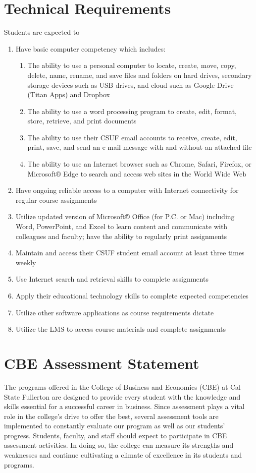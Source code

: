 \documentclass{syllabus}
\begin{document}
\section*{Technical Requirements}
Students are expected to
\begin{enumerate}
\item Have basic computer competency which includes:
\begin{enumerate}
\item	The ability to use a personal computer to locate, create, move, copy, delete, name, rename, and save files and folders on hard drives, secondary storage devices such as USB drives, and cloud such as Google Drive (Titan Apps) and Dropbox
\item	The ability to use a word processing program to create, edit, format, store, retrieve, and print documents
\item	The ability to use their CSUF email accounts to receive, create, edit, print, save, and send an e-mail message with and without an attached file
\item	The ability to use an Internet browser such as Chrome, Safari, Firefox, or Microsoft® Edge to search and access web sites in the World Wide Web
\end{enumerate}
\item	Have ongoing reliable access to a computer with Internet connectivity for regular course assignments
\item	Utilize updated version of Microsoft® Office (for P.C. or Mac) including Word, PowerPoint, and Excel to learn content and communicate with colleagues and faculty; have the ability to regularly print assignments
\item	Maintain and access their CSUF student email account at least three times weekly
\item	Use Internet search and retrieval skills to complete assignments
\item	Apply their educational technology skills to complete expected competencies
\item	Utilize other software applications as course requirements dictate
\item	Utilize the LMS to access course materials and complete assignments
\end{enumerate}



\section*{CBE Assessment Statement}
The programs offered in the College of Business and Economics (CBE) at Cal State Fullerton are designed to provide every student with the knowledge and skills essential for a successful career in business. Since assessment plays a vital role in the college's drive to offer the best, several assessment tools are implemented to constantly evaluate our program as well as our students' progress. Students, faculty, and staff should expect to participate in CBE assessment activities. In doing so, the college can measure its strengths and weaknesses and continue cultivating a climate of excellence in its students and programs.
\end{document}
